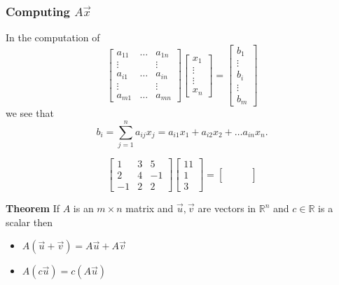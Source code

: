   \begin{frame}[fragile]\frametitle{Computing $A\vec{x}$}
In the computation of 
\[
 \left[\begin{array}{ccc}
  a_{11} & \dots & a_{1n}\\
  \vdots &       & \vdots \\
  a_{i1} & \dots & a_{in} \\
  \vdots &       & \vdots \\
  a_{m1} & \dots & a_{mn}
 \end{array}\right]
\left[\begin{array}{c} x_1 \\ \vdots \\ \vdots \\x_n \end{array}\right] 
=
\left[\begin{array}{c}
 b_1 \\ \vdots\\ b_i \\ \vdots \\ b_m 
\end{array}\right]
\]
we see that 
$$b_i = \sum_{j=1}^n a_{i j}x_j = a_{i1} x_1 + a_{i2} x_2 + \dots a_{in} x_n. $$
\end{frame}

  \begin{frame}[fragile]
\[
 \left[\begin{array}{rrr}
  1 & 3 & 5 \\
  2 & 4  & -1 \\
  -1 & 2 & 2 
 \end{array}\right]
\left[\begin{array}{r}
 11 \\ 1 \\ 3
\end{array}\right]
=
\left[\begin{array}{r}
 \qquad \\ \qquad \\  \qquad
\end{array}\right]
\]

\end{frame}

  \begin{frame}[fragile]
\textbf{Theorem} If $A$ is an $m \times n$ matrix and $\vec{u}, \vec{v}$ are vectors in 
$\mathbb R^n$ and  $c\in \mathbb R$ is a scalar then 
 \begin{itemize}
  \item $A ( \vec{u} + \vec{v}) = A \vec{u} + A\vec{v}$
  \item $A(c\vec{u}) = c(A\vec{u})$
 \end{itemize}


\end{frame}


